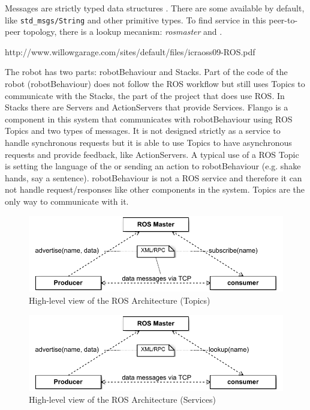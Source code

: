 Messages are strictly typed data structures . There are some available by default, like \texttt{std\_msgs/String} and other primitive types.
To find service in this peer-to-peer topology, there is a lookup mecanism: \emph{rosmaster}  and .



http://www.willowgarage.com/sites/default/files/icraoss09-ROS.pdf

The robot has two parts: robotBehaviour and Stacks.
Part of the code of the robot (robotBehaviour) does not follow the \ac{ROS} workflow but still uses Topics to communicate with the Stacks, the part of the project that does use \ac{ROS}.
In Stacks there are Servers and ActionServers that provide Services.
Flango is a component in this system that communicates with robotBehaviour using \ac{ROS} Topics and two types of messages.
It is not designed strictly as a service to handle synchronous requests but it is able to use Topics to have asynchronous requests and provide feedback, like ActionServers.
A typical use of a \ac{ROS} Topic is setting the language of the \cm or sending an action to robotBehaviour (e.g. shake hands, say a sentence).
robotBehaviour is not a \ac{ROS} service and therefore it can not handle request/responses like other components in the system.
Topics are the only way to communicate with it.


\begin{figure}[htb]
    \centering
    \includegraphics{figures/design/ros-architecture-topics.pdf}
    \caption{High-level view of the ROS Architecture (Topics)}
    \label{fig:design-ros-topics}
\end{figure}

\begin{figure}[htb]
    \centering
    \includegraphics{figures/design/ros-architecture-services.pdf}
    \caption{High-level view of the ROS Architecture (Services)}
    \label{fig:design-ros-services}
\end{figure}

